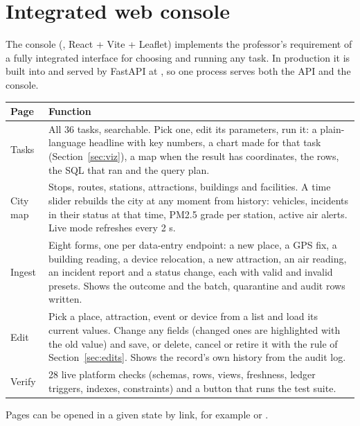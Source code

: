 \documentclass[11pt,a4paper]{article}
\begin{document}
\section{Integrated web console}\label{sec:ui}

The console (, React + Vite + Leaflet) implements the professor's requirement of
a fully integrated interface for choosing and running any task. In production it is built
into  and served by FastAPI at \code{/}, so one process serves both the API
and the console.

\begin{center}\small
\begin{tabularx}{\linewidth}{@{}p{2.2cm}X@{}}
\toprule
Page & Function \\
\midrule
Tasks & All 36 tasks, searchable. Pick one, edit its parameters, run it: a plain-language headline with key numbers, a chart made for that task (Section~\ref{sec:viz}), a map when the result has coordinates, the rows, the SQL that ran and the query plan. \\
City map & Stops, routes, stations, attractions, buildings and facilities. A time slider rebuilds the city at any moment from history: vehicles, incidents in their status at that time, PM2.5 grade per station, active air alerts. Live mode refreshes every 2 s. \\
Ingest & Eight forms, one per data-entry endpoint: a new place, a GPS fix, a building reading, a device relocation, a new attraction, an air reading, an incident report and a status change, each with valid and invalid presets. Shows the outcome and the batch, quarantine and audit rows written. \\
Edit & Pick a place, attraction, event or device from a list and load its current values. Change any fields (changed ones are highlighted with the old value) and save, or delete, cancel or retire it with the rule of Section~\ref{sec:edits}. Shows the record's own history from the audit log. \\
Verify & 28 live platform checks (schemas, rows, views, freshness, ledger triggers, indexes, constraints) and a button that runs the test suite. \\
\bottomrule
\end{tabularx}
\end{center}

Pages can be opened in a given state by link, for example 
or .
\end{document}
